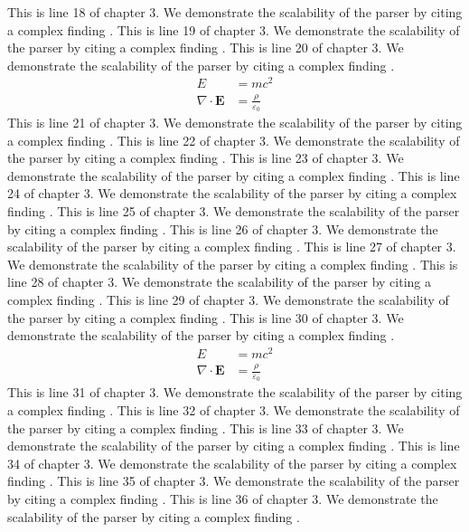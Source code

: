 This is line 18 of chapter 3. We demonstrate the scalability of the parser by citing a complex finding \cite{ref3_18}.
This is line 19 of chapter 3. We demonstrate the scalability of the parser by citing a complex finding \cite{ref3_19}.
This is line 20 of chapter 3. We demonstrate the scalability of the parser by citing a complex finding \cite{ref3_20}.
\begin{align*}
  E &= mc^2 \\
  \nabla \cdot \mathbf{E} &= \frac{\rho}{\varepsilon_0}
\end{align*}
This is line 21 of chapter 3. We demonstrate the scalability of the parser by citing a complex finding \cite{ref3_21}.
This is line 22 of chapter 3. We demonstrate the scalability of the parser by citing a complex finding \cite{ref3_22}.
This is line 23 of chapter 3. We demonstrate the scalability of the parser by citing a complex finding \cite{ref3_23}.
This is line 24 of chapter 3. We demonstrate the scalability of the parser by citing a complex finding \cite{ref3_24}.
This is line 25 of chapter 3. We demonstrate the scalability of the parser by citing a complex finding \cite{ref3_25}.
This is line 26 of chapter 3. We demonstrate the scalability of the parser by citing a complex finding \cite{ref3_26}.
This is line 27 of chapter 3. We demonstrate the scalability of the parser by citing a complex finding \cite{ref3_27}.
This is line 28 of chapter 3. We demonstrate the scalability of the parser by citing a complex finding \cite{ref3_28}.
This is line 29 of chapter 3. We demonstrate the scalability of the parser by citing a complex finding \cite{ref3_29}.
This is line 30 of chapter 3. We demonstrate the scalability of the parser by citing a complex finding \cite{ref3_30}.
\begin{align*}
  E &= mc^2 \\
  \nabla \cdot \mathbf{E} &= \frac{\rho}{\varepsilon_0}
\end{align*}
This is line 31 of chapter 3. We demonstrate the scalability of the parser by citing a complex finding \cite{ref3_31}.
This is line 32 of chapter 3. We demonstrate the scalability of the parser by citing a complex finding \cite{ref3_32}.
This is line 33 of chapter 3. We demonstrate the scalability of the parser by citing a complex finding \cite{ref3_33}.
This is line 34 of chapter 3. We demonstrate the scalability of the parser by citing a complex finding \cite{ref3_34}.
This is line 35 of chapter 3. We demonstrate the scalability of the parser by citing a complex finding \cite{ref3_35}.
This is line 36 of chapter 3. We demonstrate the scalability of the parser by citing a complex finding \cite{ref3_36}.
